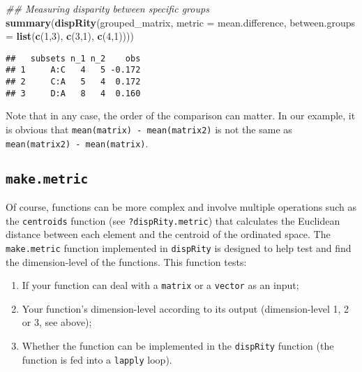 \documentclass[
]{book}
\newenvironment{Shaded}{\begin{snugshade}}{\end{snugshade}}
\newcommand{\CommentTok}[1]{\textcolor[rgb]{0.56,0.35,0.01}{\textit{#1}}}
\newcommand{\DataTypeTok}[1]{\textcolor[rgb]{0.13,0.29,0.53}{#1}}
\newcommand{\DecValTok}[1]{\textcolor[rgb]{0.00,0.00,0.81}{#1}}
\newcommand{\KeywordTok}[1]{\textcolor[rgb]{0.13,0.29,0.53}{\textbf{#1}}}
\newcommand{\NormalTok}[1]{#1}
\providecommand{\tightlist}{%
  \setlength{\itemsep}{0pt}\setlength{\parskip}{0pt}}
\begin{document}
\begin{Shaded}
\begin{Highlighting}[]
\CommentTok{\#\# Measuring disparity between specific groups}
\KeywordTok{summary}\NormalTok{(}\KeywordTok{dispRity}\NormalTok{(grouped\_matrix, }\DataTypeTok{metric =}\NormalTok{ mean.difference,}
                 \DataTypeTok{between.groups =} \KeywordTok{list}\NormalTok{(}\KeywordTok{c}\NormalTok{(}\DecValTok{1}\NormalTok{,}\DecValTok{3}\NormalTok{), }\KeywordTok{c}\NormalTok{(}\DecValTok{3}\NormalTok{,}\DecValTok{1}\NormalTok{), }\KeywordTok{c}\NormalTok{(}\DecValTok{4}\NormalTok{,}\DecValTok{1}\NormalTok{))))}
\end{Highlighting}
\end{Shaded}

\begin{verbatim}
##   subsets n_1 n_2    obs
## 1     A:C   4   5 -0.172
## 2     C:A   5   4  0.172
## 3     D:A   8   4  0.160
\end{verbatim}

Note that in any case, the order of the comparison can matter.
In our example, it is obvious that \texttt{mean(matrix)\ -\ mean(matrix2)} is not the same as \texttt{mean(matrix2)\ -\ mean(matrix)}.

\hypertarget{makemetric}{%
\subsection{\texorpdfstring{\texttt{make.metric}}{make.metric}}\label{makemetric}}

Of course, functions can be more complex and involve multiple operations such as the \texttt{centroids} function (see \texttt{?dispRity.metric}) that calculates the Euclidean distance between each element and the centroid of the ordinated space.
The \texttt{make.metric} function implemented in \texttt{dispRity} is designed to help test and find the dimension-level of the functions.
This function tests:

\begin{enumerate}
\def\labelenumi{\arabic{enumi}.}
\tightlist
\item
  If your function can deal with a \texttt{matrix} or a \texttt{vector} as an input;
\item
  Your function's dimension-level according to its output (dimension-level 1, 2 or 3, see above);
\item
  Whether the function can be implemented in the \texttt{dispRity} function (the function is fed into a \texttt{lapply} loop).
\end{enumerate}
\end{document}
